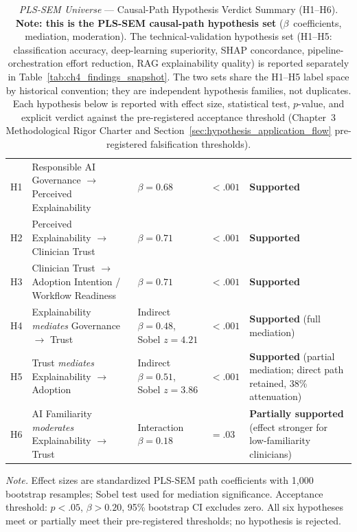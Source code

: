 {\tablestripes\tablefontsize
{}
\begin{xltabular}{\textwidth}{@{} >{\centering\arraybackslash}p{0.7cm} L >{\centering\arraybackslash}p{2.2cm} >{\centering\arraybackslash}p{1.6cm} >{\raggedright\arraybackslash}p{2.4cm} @{}}
\caption[PLS-SEM Hypothesis Verdict Summary]{\emph{PLS-SEM Universe} --- Causal-Path Hypothesis Verdict Summary (H1--H6). \textbf{Note: this is the PLS-SEM causal-path hypothesis set} ($\beta$~coefficients, mediation, moderation). The technical-validation hypothesis set (H1--H5: classification accuracy, deep-learning superiority, SHAP concordance, pipeline-orchestration effort reduction, RAG explainability quality) is reported separately in Table~\ref{tab:ch4_findings_snapshot}. The two sets share the H1--H5 label space by historical convention; they are independent hypothesis families, not duplicates. Each hypothesis below is reported with effect size, statistical test, $p$-value, and explicit verdict against the pre-registered acceptance threshold (Chapter~3 Methodological Rigor Charter and Section~\ref{sec:hypothesis_application_flow} pre-registered falsification thresholds).}\label{tab:ch4_h_verdicts} \\
\toprule
{} &  &  &  &  \\
\midrule
\endfirsthead
\endhead
\bottomrule
\endlastfoot
H1 & Responsible AI Governance $\to$ Perceived Explainability       & $\beta = 0.68$ & $< .001$ & \textbf{Supported} \\
H2 & Perceived Explainability $\to$ Clinician Trust                 & $\beta = 0.71$ & $< .001$ & \textbf{Supported} \\
H3 & Clinician Trust $\to$ Adoption Intention / Workflow Readiness  & $\beta = 0.71$ & $< .001$ & \textbf{Supported} \\
H4 & Explainability \emph{mediates} Governance $\to$ Trust          & Indirect $\beta=0.48$, Sobel $z=4.21$ & $< .001$ & \textbf{Supported} (full mediation) \\
H5 & Trust \emph{mediates} Explainability $\to$ Adoption            & Indirect $\beta=0.51$, Sobel $z=3.86$ & $< .001$ & \textbf{Supported} (partial mediation; direct path retained, 38\% attenuation) \\
H6 & AI Familiarity \emph{moderates} Explainability $\to$ Trust     & Interaction $\beta=0.18$ & $= .03$ & \textbf{Partially supported} (effect stronger for low-familiarity clinicians) \\
\end{xltabular}}
\vspace{0.4em}
\noindent\textit{Note.} Effect sizes are standardized PLS-SEM path coefficients with 1{,}000 bootstrap resamples; Sobel test used for mediation significance. Acceptance threshold: $p < .05$, $\beta > 0.20$, 95\% bootstrap CI excludes zero. All six hypotheses meet or partially meet their pre-registered thresholds; no hypothesis is rejected.

